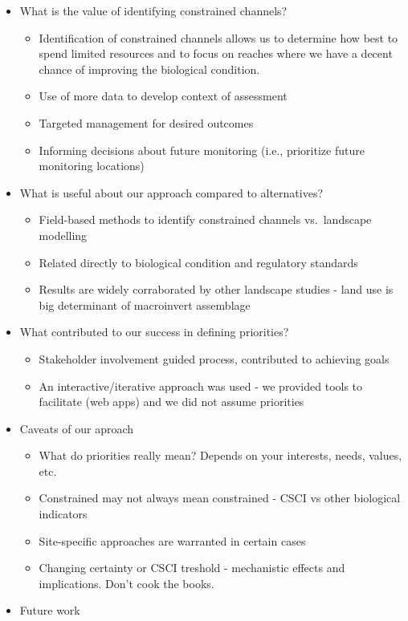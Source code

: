 \documentclass[]{article}
\providecommand{\tightlist}{%
  \setlength{\itemsep}{0pt}\setlength{\parskip}{0pt}}
\begin{document}
\begin{itemize}
\tightlist
\item
  What is the value of identifying constrained channels?

  \begin{itemize}
  \tightlist
  \item
    Identification of constrained channels allows us to determine how
    best to spend limited resources and to focus on reaches where we
    have a decent chance of improving the biological condition.
  \item
    Use of more data to develop context of assessment
  \item
    Targeted management for desired outcomes
  \item
    Informing decisions about future monitoring (i.e., prioritize future
    monitoring locations)
  \end{itemize}
\item
  What is useful about our approach compared to alternatives?

  \begin{itemize}
  \tightlist
  \item
    Field-based methods to identify constrained channels vs.~landscape
    modelling
  \item
    Related directly to biological condition and regulatory standards
  \item
    Results are widely corraborated by other landscape studies - land
    use is big determinant of macroinvert assemblage
  \end{itemize}
\item
  What contributed to our success in defining priorities?

  \begin{itemize}
  \tightlist
  \item
    Stakeholder involvement guided process, contributed to achieving
    goals
  \item
    An interactive/iterative approach was used - we provided tools to
    facilitate (web apps) and we did not assume priorities
  \end{itemize}
\item
  Caveats of our aproach

  \begin{itemize}
  \tightlist
  \item
    What do priorities really mean? Depends on your interests, needs,
    values, etc.
  \item
    Constrained may not always mean constrained - CSCI vs other
    biological indicators
  \item
    Site-specific approaches are warranted in certain cases
  \item
    Changing certainty or CSCI treshold - mechanistic effects and
    implications. Don't cook the books.
  \end{itemize}
\item
  Future work


\end{itemize}
\end{document}
